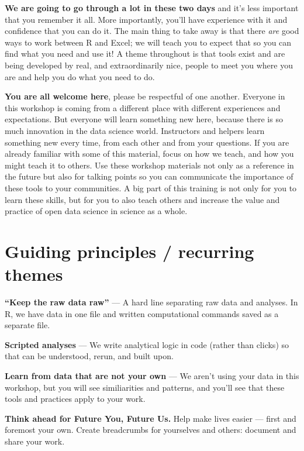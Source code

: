 \documentclass[]{book}
\begin{document}
\textbf{We are going to go through a lot in these two days} and it's less important that you remember it all. More importantly, you'll have experience with it and confidence that you can do it. The main thing to take away is that there \emph{are} good ways to work between R and Excel; we will teach you to expect that so you can find what you need and use it! A theme throughout is that tools exist and are being developed by real, and extraordinarily nice, people to meet you where you are and help you do what you need to do.

\textbf{You are all welcome here}, please be respectful of one another. Everyone in this workshop is coming from a different place with different experiences and expectations. But everyone will learn something new here, because there is so much innovation in the data science world. Instructors and helpers learn something new every time, from each other and from your questions. If you are already familiar with some of this material, focus on how we teach, and how you might teach it to others. Use these workshop materials not only as a reference in the future but also for talking points so you can communicate the importance of these tools to your communities. A big part of this training is not only for you to learn these skills, but for you to also teach others and increase the value and practice of open data science in science as a whole.

\hypertarget{guiding-principles-recurring-themes}{%
\section{Guiding principles / recurring themes}\label{guiding-principles-recurring-themes}}

\textbf{``Keep the raw data raw''} --- A hard line separating raw data and analyses. In R, we have data in one file and written computational commands saved as a separate file.

\textbf{Scripted analyses} --- We write analytical logic in code (rather than clicks) so that can be understood, rerun, and built upon.

\textbf{Learn from data that are not your own} --- We aren't using your data in this workshop, but you will see similiarities and patterns, and you'll see that these tools and practices apply to your work.

\textbf{Think ahead for Future You, Future Us.} Help make lives easier --- first and foremost your own. Create breadcrumbs for yourselves and others: document and share your work.
\end{document}
